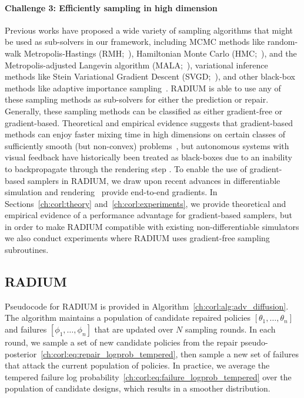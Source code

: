 {\paragraph{Challenge 3: Efficiently sampling in high dimension}
%
Previous works have proposed a wide variety of sampling algorithms that might be used as sub-solvers in our framework, including MCMC methods like random-walk Metropolis-Hastings (RMH;~\cite{hastingsMonteCarloSampling1970}), Hamiltonian Monte Carlo (HMC;~\cite{nealMCMCUsingHamiltonian2011}), and the Metropolis-adjusted Langevin algorithm (MALA;~\cite{julianbresagCommentsGrenadierMiller1994}), variational inference methods like Stein Variational Gradient Descent (SVGD;~\cite{liuSteinVariationalGradient2016a}), and other black-box methods like adaptive importance sampling~\cite{okellyScalableEndtoEndAutonomous2018}. RADIUM is able to use any of these sampling methods as sub-solvers for either the prediction or repair. Generally, these sampling methods can be classified as either gradient-free or gradient-based. Theoretical and empirical evidence suggests that gradient-based methods can enjoy faster mixing time in high dimensions on certain classes of sufficiently smooth (but non-convex) problems~\cite{maSamplingCanBe2019}, but autonomous systems with visual feedback have historically  been treated as black-boxes due to an inability to backpropagate through the rendering step \cite{zhouRoCUSRobotController2021,okellyScalableEndtoEndAutonomous2018,sinhaNeuralBridgeSampling2020}.
%
To enable the use of gradient-based samplers in RADIUM, we draw upon recent advances in differentiable simulation and rendering~\cite{huDiffTaichiDifferentiableProgramming2019,lelidecDifferentiableRenderingPerturbed2021} provide end-to-end gradients. In Sections~\ref{ch:corl:theory} and~\ref{ch:corl:experiments}, we provide theoretical and empirical evidence of a performance advantage for gradient-based samplers, but in order to make RADIUM compatible with existing non-differentiable simulators we also conduct experiments where RADIUM uses gradient-free sampling subroutines.

\subsection{RADIUM}

Pseudocode for RADIUM is provided in Algorithm~\ref{ch:corl:alg:adv_diffusion}. The algorithm maintains a population of candidate repaired policies $[\theta_1, \ldots, \theta_n]$ and failures $[\phi_1, \ldots, \phi_n]$ that are updated over $N$ sampling rounds. In each round, we sample a set of new candidate policies from the repair pseudo-posterior~\eqref{ch:corl:eq:repair_logprob_tempered}, then sample a new set of failures that attack the current population of policies. In practice, we average the tempered failure log probability~\eqref{ch:corl:eq:failure_logprob_tempered} over the population of candidate designs, which results in a smoother distribution.

}
